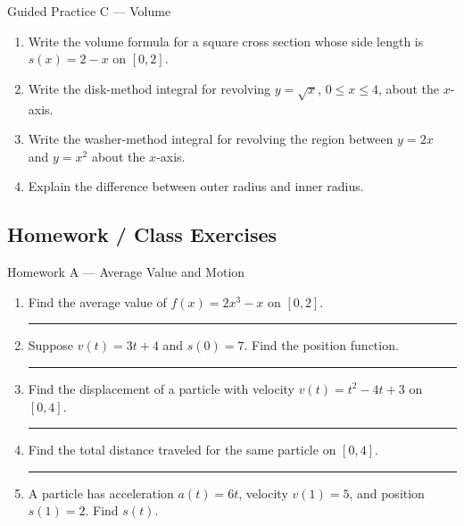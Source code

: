 \documentclass[11pt]{article}
\newcommand{\hwspace}{\vspace{0.8em}\hrule\vspace{0.8em}}
\begin{document}
\begin{practicebox}{Guided Practice C --- Volume}
\begin{enumerate}
    \item Write the volume formula for a square cross section whose side length is \(s(x)=2-x\) on \([0,2]\).
    \item Write the disk-method integral for revolving \(y=\sqrt{x}\), \(0\le x\le 4\), about the \(x\)-axis.
    \item Write the washer-method integral for revolving the region between \(y=2x\) and \(y=x^2\) about the \(x\)-axis.
    \item Explain the difference between outer radius and inner radius.
\end{enumerate}
\end{practicebox}

\newpage
\subsection{Homework / Class Exercises}

\begin{homeworkset}{Homework A --- Average Value and Motion}
\begin{enumerate}
    \item Find the average value of \(f(x)=2x^3-x\) on \([0,2]\).
    \hwspace

    \item Suppose \(v(t)=3t+4\) and \(s(0)=7\). Find the position function.
    \hwspace

    \item Find the displacement of a particle with velocity \(v(t)=t^2-4t+3\) on \([0,4]\).
    \hwspace

    \item Find the total distance traveled for the same particle on \([0,4]\).
    \hwspace

    \item A particle has acceleration \(a(t)=6t\), velocity \(v(1)=5\), and position \(s(1)=2\). Find \(s(t)\).
\end{enumerate}
\end{homeworkset}
\end{document}

